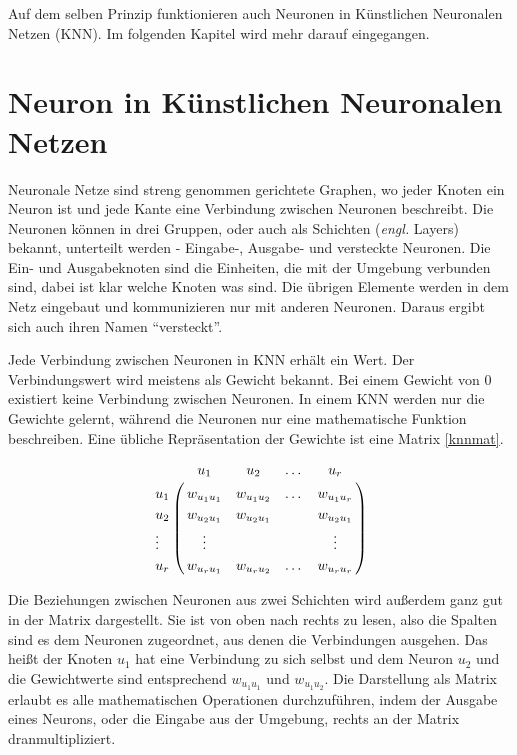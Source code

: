 Auf dem selben Prinzip funktionieren auch Neuronen in Künstlichen Neuronalen Netzen (KNN). Im folgenden Kapitel wird mehr darauf eingegangen. \cite{NWIKI:19} \cite{GEHIRN:12}

\section{Neuron in Künstlichen Neuronalen Netzen}

Neuronale Netze sind streng genommen gerichtete Graphen, wo jeder Knoten ein Neuron ist und jede Kante eine Verbindung zwischen Neuronen beschreibt. Die Neuronen können in drei Gruppen, oder auch als Schichten (\textit{engl.} Layers) bekannt, unterteilt werden - Eingabe-, Ausgabe- und versteckte Neuronen. Die Ein- und Ausgabeknoten sind die Einheiten, die mit der Umgebung verbunden sind, dabei ist klar welche Knoten was sind. Die übrigen Elemente werden in dem Netz eingebaut und kommunizieren nur mit anderen Neuronen. Daraus ergibt sich auch ihren Namen ``versteckt''.

Jede Verbindung zwischen Neuronen in KNN erhält ein Wert. Der Verbindungswert wird meistens als Gewicht bekannt. Bei einem Gewicht von 0 existiert keine Verbindung zwischen Neuronen. In einem KNN werden nur die Gewichte gelernt, während die Neuronen nur eine mathematische Funktion beschreiben. Eine übliche Repräsentation der Gewichte ist eine Matrix \ref{knnmat}.

\begin{align}
	\label{knnmat}
	\bordermatrix{ 	
			   & u_1 			& u_2			 & \dots & u_r			    \cr
		u_1    & w_{u_{1}u_{1}} & w_{u_{1}u_{2}} & \dots & w_{u_{1}u_r}		\cr
		u_2	   & w_{u_{2}u_{1}} & w_{u_{2}u_{1}} & 	     & w_{u_{2}u_{1}}	\cr
		\vdots & \vdots	      	& 			     &       & \vdots			\cr
		u_r    & w_{u_{r}u_{1}} & w_{u_{r}u_{2}} & \dots & w_{u_{r}u_r}  	\cr 
	}
\end{align}

Die Beziehungen zwischen Neuronen aus zwei Schichten wird außerdem ganz gut in der Matrix dargestellt. Sie ist von oben nach rechts zu lesen, also die Spalten sind es dem Neuronen zugeordnet, aus denen die Verbindungen ausgehen. Das heißt der Knoten $u_1$ hat eine Verbindung zu sich selbst und dem Neuron $u_2$ und die Gewichtwerte sind entsprechend $w_{u_{1}u_{1}}$ und $w_{u_{1}u_{2}}$. Die Darstellung als Matrix erlaubt es alle mathematischen Operationen durchzuführen, indem der Ausgabe eines Neurons, oder die Eingabe aus der Umgebung, rechts an der Matrix dranmultipliziert. \cite{CIKruse:15} \cite{NFMBothe:98} \cite{SCTemassi:01} \cite{CISCNFI:98}

